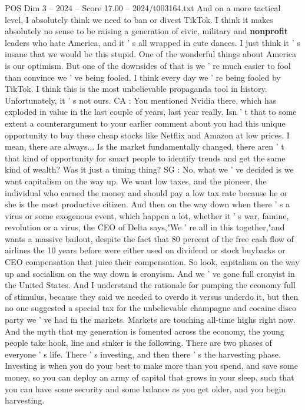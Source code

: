 \begin{textsample}{POS Dim 3 – 2024 – Score 17.00 – 2024/t003164.txt}
And on a more tactical level, I absolutely think we need to ban or divest TikTok.
I think it makes absolutely no sense to be raising a generation of civic, military and \textbf{nonprofit} leaders who hate America, and it ' s all wrapped in cute dances.
I just think it ' s insane that we would be this stupid.
One of the wonderful things about America is our optimism.
But one of the downsides of that is we ' re much easier to fool than convince we ' ve being fooled.
I think every day we ' re being fooled by TikTok.
I think this is the most unbelievable propaganda tool in history.
Unfortunately, it ' s not ours.
CA : You mentioned Nvidia there, which has exploded in value in the last couple of years, last year really.
Isn ' t that to some extent a counterargument to your earlier comment about you had this unique opportunity to buy these cheap stocks like Netflix and Amazon at low prices.
I mean, there are always...
Is the market fundamentally changed, there aren ' t that kind of opportunity for smart people to identify trends and get the same kind of wealth?
Was it just a timing thing?
SG : No, what we ' ve decided is we want capitalism on the way up.
We want low taxes, and the pioneer, the individual who earned the money and should pay a low tax rate because he or she is the most productive citizen.
And then on the way down when there ' s a virus or some exogenous event, which happen a lot, whether it ' s war, famine, revolution or a virus, the CEO of Delta says,"We ' re all in this together,"and wants a massive bailout, despite the fact that 80 percent of the free cash flow of airlines the 10 years before were either used on dividend or stock buybacks or CEO compensation that juice their compensation.
So look, capitalism on the way up and socialism on the way down is cronyism.
And we ' ve gone full cronyist in the United States.
And I understand the rationale for pumping the economy full of stimulus, because they said we needed to overdo it versus underdo it, but then no one suggested a special tax for the unbelievable champagne and cocaine disco party we ' ve had in the markets.
Markets are touching all-time highs right now.
And the myth that my generation is fomented across the economy, the young people take hook, line and sinker is the following.
There are two phases of everyone ' s life.
There ' s investing, and then there ' s the harvesting phase.
Investing is when you do your best to make more than you spend, and save some money, so you can deploy an army of capital that grows in your sleep, such that you can have some security and some balance as you get older, and you begin harvesting.

\end{textsample}
